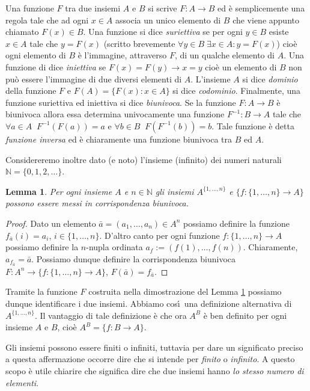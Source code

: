 \documentclass{amsart}
\newtheorem{lem}[thm]{Lemma}
\newcommand\N{{\mathbb N}}
\begin{document}
Una funzione $F$ tra due insiemi $A$ e $B$ si scrive $F:A\to B$ ed \`e
semplicemente una regola tale che ad ogni $x\in A$ associa un unico elemento di
$B$ che viene appunto chiamato $F(x)\in B$. Una funzione si dice
\emph{suriettiva} se per ogni $y\in B$ esiste $x\in A$ tale che $y=F(x)$
(scritto brevemente $\forall y\in B \;\exists x\in A : y=F(x)$) cio\`e
ogni elemento di $B$ \`e l'immagine, attraverso $F$, di un qualche
elemento di $A$. Una funzione di dice \emph{iniettiva} se
$F(x)=F(y)\rightarrow x=y$ cio\`e un elemento di $B$ non pu\`o essere
l'immagine di due diversi elementi di $A$. L'insieme $A$ si dice
\emph{dominio} della funzione $F$ e $F(A)=\{F(x): x\in A\}$ si dice
\emph{codominio}. Finalmente, una funzione 
suriettiva ed iniettiva si dice \emph{biunivoca}. Se la funzione
$F:A\to B$ \`e biunivoca allora essa determina univocamente una
funzione $F^{-1}:B\to A$ tale che $\forall a\in A \;\; F^{-1}(F(a))=a$ e
$\forall b\in B \;\; F(F^{-1}(b))=b$. Tale funzione \`e detta
\emph{funzione inversa} ed \`e chiaramente una funzione biunivoca tra
$B$ ed $A$.

Considereremo inoltre dato (e noto) l'insieme (infinito) dei numeri naturali
$\N=\{0,1,2,\dots\}$.

\begin{lem}\label{lem:prod}
Per ogni insieme $A$ e $n\in\N$ gli insiemi $A^{\{1,\dots,n\}}$ e
$\{f:\{1,\dots,n\}\to A\}$ possono essere messi in corrispondenza
biunivoca. 
\end{lem}
\begin{proof}
Dato un elemento $\bar a=(a_1, \dots,a_n)\in A^n$ possiamo definire la
funzione $f_{\bar a}(i)=a_i$, $i\in\{1,\dots,n\}$. D'altro canto per ogni
funzione $f:\{1,\dots,n\}\to A$ possiamo definire la $n$-nupla ordinata
$a_f:=(f(1),\dots,f(n))$. Chiaramente, $a_{f_{\bar a}}=\bar
a$. Possiamo dunque definire la corrispondenza 
biunivoca $F:A^n\to \{f:\{1,\dots,n\}\to A\}$, $F(\bar a)=f_{\bar a}$.
\end{proof}

Tramite la funzione $F$ costruita nella dimostrazione del Lemma
\ref{lem:prod} possiamo dunque identificare i due
insiemi. Abbiamo cos\'\i\  una definizione alternativa di
$A^{\{1,\dots,n\}}$. Il vantaggio di tale definizione \`e che ora
$A^B$ \`e ben definito per ogni insieme $A$ e $B$, cio\`e
$A^B=\{f:B\to A\}$.

 
Gli insiemi possono essere finiti o infiniti, tuttavia per dare un
significato preciso a questa affermazione occorre dire che si intende
per \emph{finito} o \emph{infinito}. A questo scopo \`e utile chiarire
che significa dire che due insiemi hanno \emph{lo stesso numero di elementi}.
\end{document}
